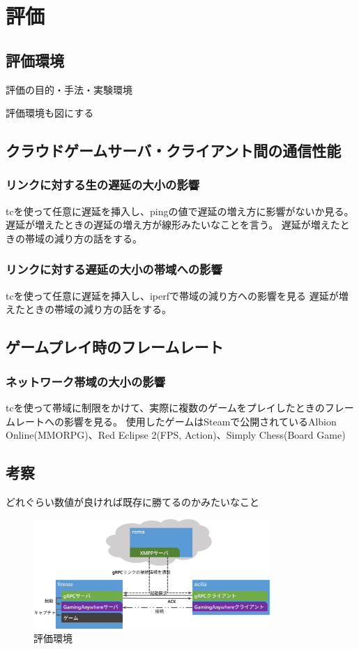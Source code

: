 \section{評価}

\subsection{評価環境}
評価の目的・手法・実験環境

評価環境も図にする

\subsection{クラウドゲームサーバ・クライアント間の通信性能}

\subsubsection{リンクに対する生の遅延の大小の影響}
tcを使って任意に遅延を挿入し、pingの値で遅延の増え方に影響がないか見る。
遅延が増えたときの遅延の増え方が線形みたいなことを言う。
遅延が増えたときの帯域の減り方の話をする。

\subsubsection{リンクに対する遅延の大小の帯域への影響}
tcを使って任意に遅延を挿入し、iperfで帯域の減り方への影響を見る
遅延が増えたときの帯域の減り方の話をする。

\subsection{ゲームプレイ時のフレームレート}

\subsubsection{ネットワーク帯域の大小の影響}
tcを使って帯域に制限をかけて、実際に複数のゲームをプレイしたときのフレームレートへの影響を見る。
使用したゲームはSteamで公開されているAlbion Online(MMORPG)、Red Eclipse 2(FPS, Action)、Simply Chess(Board Game)

\subsection{考察}
どれぐらい数値が良ければ既存に勝てるのかみたいなこと

\begin{figure}[t]
    \centering
    \includegraphics[width=0.8\textwidth,keepaspectratio,clip]{img/experimentalenvironment.eps}
    \caption{評価環境}
    \label{fig:expenv}
\end{figure}

